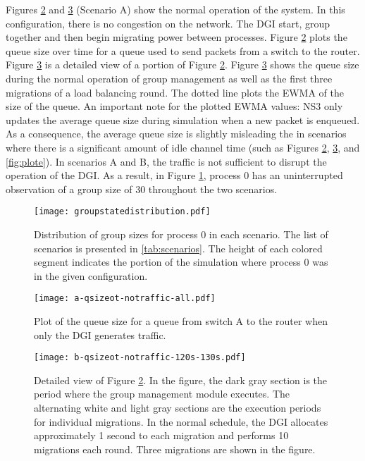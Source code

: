 Figures \ref{fig:plota} and \ref{fig:plotb} (Scenario A) show the normal operation of the system.
In this configuration, there is no congestion on the network. 
The \ac{DGI} start, group together and then begin migrating power between processes.
Figure \ref{fig:plota} plots the queue size over time for a queue used to send packets from a switch to the router.
Figure \ref{fig:plotb} is a detailed view of a portion of Figure \ref{fig:plota}.
Figure \ref{fig:plotb} shows the queue size during the normal operation of group management as well as the first three migrations of a load balancing round.
The dotted line plots the \ac{EWMA} of the size of the queue.
An important note for the plotted \ac{EWMA} values: \ac{NS3} only updates the average queue size during simulation when a new packet is enqueued.
As a consequence, the average queue size is slightly misleading the in scenarios where there is a significant amount of idle channel time (such as Figures \ref{fig:plota}, \ref{fig:plotb}, and \ref{fig:plote}).
In scenarios A and B, the traffic is not sufficient to disrupt the operation of the DGI.
As a result, in Figure \ref{fig:groupstatedistro}, process 0 has an uninterrupted observation of a group size of 30 throughout the two scenarios.

\begin{figure}
\centering
\texttt{[image: groupstatedistribution.pdf]}
\caption[Distribution of group sizes for process 0 in each scenario.]{Distribution of group sizes for process 0 in each scenario. The list of scenarios is presented in \ref{tab:scenarios}.  The height of each colored segment indicates the portion of the simulation where process 0 was in the given configuration.}
\label{fig:groupstatedistro}
\end{figure}

\begin{figure}
\centering
\texttt{[image: a-qsizeot-notraffic-all.pdf]}
\caption{Plot of the queue size for a queue from switch A to the router when only the DGI generates traffic.}
\label{fig:plota}
\end{figure}

\begin{figure}
\centering
\texttt{[image: b-qsizeot-notraffic-120s-130s.pdf]}
\caption[Detailed view of Figure \ref{fig:plota}.]{
Detailed view of Figure \ref{fig:plota}. In the figure, the dark gray section is the period where the group management module executes.
The alternating white and light gray sections are the execution periods for individual migrations.
In the normal schedule, the DGI allocates approximately 1 second to each migration and performs 10 migrations each round.
Three migrations are shown in the figure.}
\label{fig:plotb}
\end{figure}

